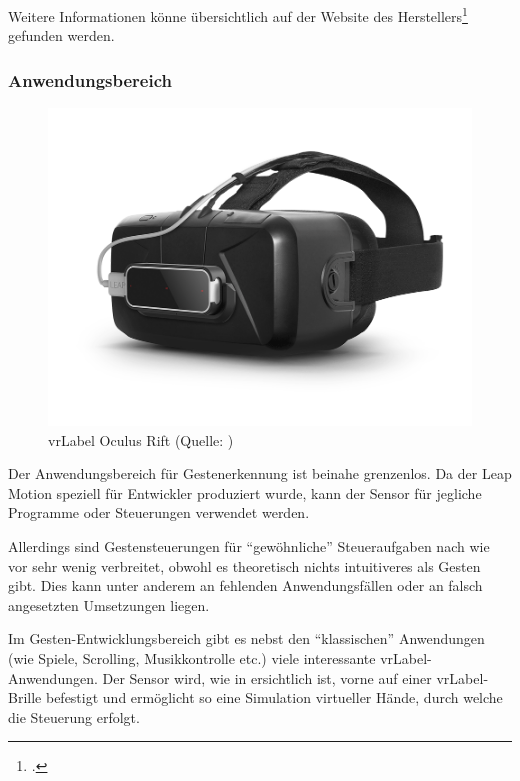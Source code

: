 Weitere Informationen könne übersichtlich auf der Website des Herstellers\footcite{Leap_Motion_Motion_Controller_2015-03-27} gefunden werden.

\subsubsection{Anwendungsbereich}
\begin{figure}
	\includegraphics[width=1.0\linewidth]{images/analysis/leap_vr.png}
	\caption[Oculus Rift VR]{\acrshort{vrLabel} Oculus Rift (Quelle: )}
	\label{fig:leap_vr}
\end{figure}

Der Anwendungsbereich für Gestenerkennung ist beinahe grenzenlos.
Da der Leap Motion speziell für Entwickler produziert wurde, kann der Sensor für jegliche Programme oder Steuerungen verwendet werden.

Allerdings sind Gestensteuerungen für "`gewöhnliche"' Steueraufgaben nach wie vor sehr wenig verbreitet, obwohl es theoretisch nichts intuitiveres als Gesten gibt.
Dies kann unter anderem an fehlenden Anwendungsfällen oder an falsch angesetzten Umsetzungen liegen.

Im Gesten-Entwicklungsbereich gibt es nebst den "`klassischen"' Anwendungen (wie Spiele, Scrolling, Musikkontrolle etc.) viele interessante  \gls{vrLabel}-Anwendungen. Der Sensor wird, wie in  ersichtlich ist, vorne auf einer \gls{vrLabel}-Brille befestigt und ermöglicht so eine Simulation virtueller Hände, durch welche die Steuerung erfolgt.

